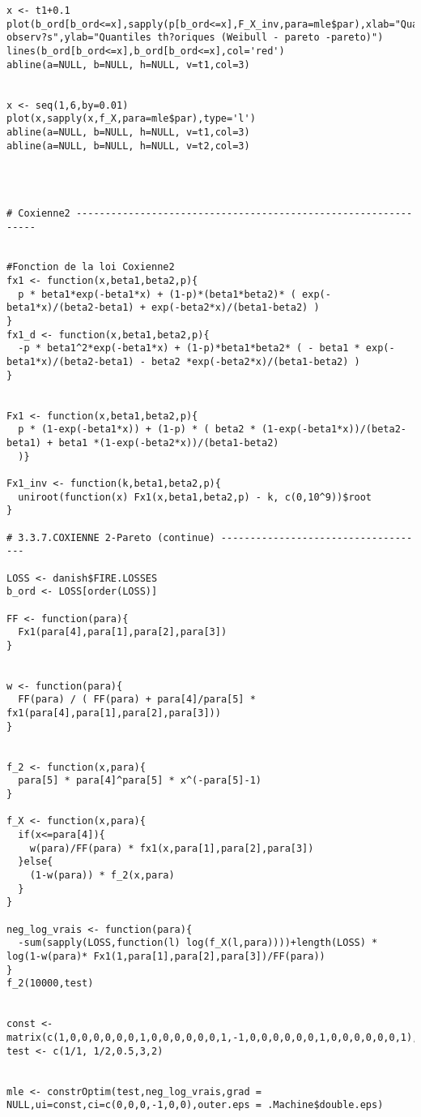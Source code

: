 \begin{verbatim}
x <- t1+0.1
plot(b_ord[b_ord<=x],sapply(p[b_ord<=x],F_X_inv,para=mle$par),xlab="Quantiles observ?s",ylab="Quantiles th?oriques (Weibull - pareto -pareto)")
lines(b_ord[b_ord<=x],b_ord[b_ord<=x],col='red')
abline(a=NULL, b=NULL, h=NULL, v=t1,col=3)


x <- seq(1,6,by=0.01)
plot(x,sapply(x,f_X,para=mle$par),type='l')
abline(a=NULL, b=NULL, h=NULL, v=t1,col=3)
abline(a=NULL, b=NULL, h=NULL, v=t2,col=3)




# Coxienne2 ---------------------------------------------------------------


#Fonction de la loi Coxienne2
fx1 <- function(x,beta1,beta2,p){
  p * beta1*exp(-beta1*x) + (1-p)*(beta1*beta2)* ( exp(-beta1*x)/(beta2-beta1) + exp(-beta2*x)/(beta1-beta2) )
}
fx1_d <- function(x,beta1,beta2,p){
  -p * beta1^2*exp(-beta1*x) + (1-p)*beta1*beta2* ( - beta1 * exp(-beta1*x)/(beta2-beta1) - beta2 *exp(-beta2*x)/(beta1-beta2) )
}


Fx1 <- function(x,beta1,beta2,p){
  p * (1-exp(-beta1*x)) + (1-p) * ( beta2 * (1-exp(-beta1*x))/(beta2-beta1) + beta1 *(1-exp(-beta2*x))/(beta1-beta2)
  )}

Fx1_inv <- function(k,beta1,beta2,p){ 
  uniroot(function(x) Fx1(x,beta1,beta2,p) - k, c(0,10^9))$root
}

# 3.3.7.COXIENNE 2-Pareto (continue) ------------------------------------

LOSS <- danish$FIRE.LOSSES
b_ord <- LOSS[order(LOSS)]

FF <- function(para){
  Fx1(para[4],para[1],para[2],para[3])
}


w <- function(para){
  FF(para) / ( FF(para) + para[4]/para[5] * fx1(para[4],para[1],para[2],para[3]))
}


f_2 <- function(x,para){
  para[5] * para[4]^para[5] * x^(-para[5]-1)
}

f_X <- function(x,para){
  if(x<=para[4]){
    w(para)/FF(para) * fx1(x,para[1],para[2],para[3])
  }else{
    (1-w(para)) * f_2(x,para)
  } 
}

neg_log_vrais <- function(para){
  -sum(sapply(LOSS,function(l) log(f_X(l,para))))+length(LOSS) * log(1-w(para)* Fx1(1,para[1],para[2],para[3])/FF(para))
}
f_2(10000,test)


const <- matrix(c(1,0,0,0,0,0,0,1,0,0,0,0,0,0,1,-1,0,0,0,0,0,0,1,0,0,0,0,0,0,1),6,5)
test <- c(1/1, 1/2,0.5,3,2)


mle <- constrOptim(test,neg_log_vrais,grad = NULL,ui=const,ci=c(0,0,0,-1,0,0),outer.eps = .Machine$double.eps)


\end{verbatim}
